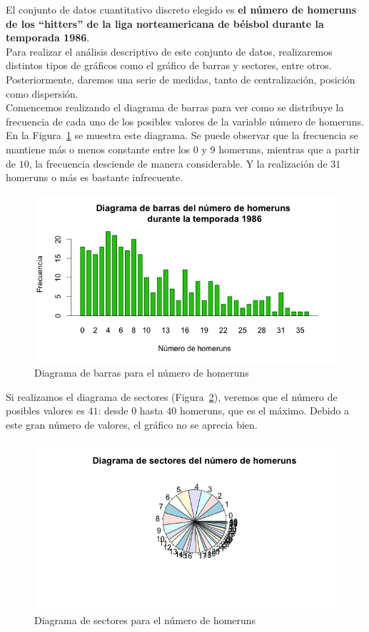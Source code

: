 \documentclass[12pt,a4paper,twoside,openright,titlepage,final]{article}
\begin{document}
El conjunto de datos cuantitativo discreto elegido es \textbf{el número de homeruns de los ``hitters'' de la liga norteamericana de béisbol durante la temporada 1986}.\\

Para realizar el análisis descriptivo de este conjunto de datos, realizaremos distintos tipos de gráficos como el gráfico de barras y sectores, entre otros. Posteriormente, daremos una serie de medidas, tanto de centralización, posición como dispersión.\\

Comencemos realizando el diagrama de barras para ver como se distribuye la frecuencia de cada uno de los posibles valores de la variable número de homeruns. En la Figura~\ref{fig:diagrama_barras_homeruns} se muestra este diagrama. Se puede observar que la frecuencia se mantiene más o menos constante entre los $0$ y $9$ homeruns, mientras que a partir de $10$, la frecuencia desciende de manera considerable. Y la realización de $31$ homeruns o más es bastante infrecuente.\\

\begin{figure}[tbph!]
\centering
\includegraphics[width=0.8\linewidth]{imagenes/diagrama_barras_homeruns}
\caption{Diagrama de barras para el número de homeruns}
\label{fig:diagrama_barras_homeruns}
\end{figure}

Si realizamos el diagrama de sectores (Figura~\ref{fig:diagrama_sector_homeruns}), veremos que el número de posibles valores es $41$: desde $0$ hasta $40$ homeruns, que es el máximo. Debido a este gran número de valores, el gráfico no se aprecia bien.\\

\begin{figure}[tbph!]
\centering
\includegraphics[width=0.8\linewidth]{imagenes/diagrama_sectores_homeruns}
\caption{Diagrama de sectores para el número de homeruns}
\label{fig:diagrama_sector_homeruns}
\end{figure}
\end{document}
